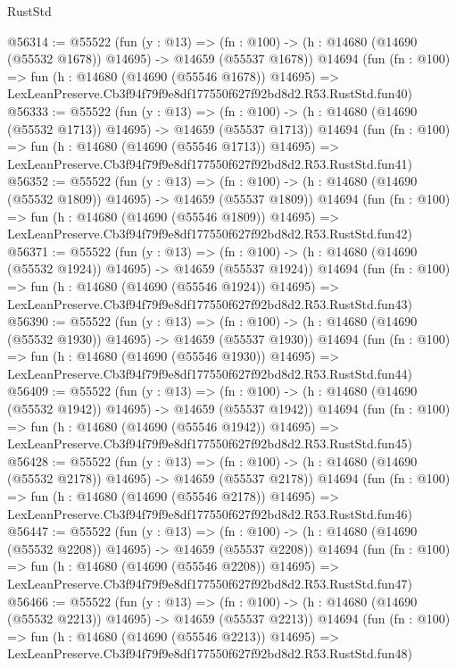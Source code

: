 \begin{lexlean}{RustStd}
\begin{coremodule}
@56314 := @55522
    (fun (y : @13) =>
    (fn : @100) -> (h : @14680 (@14690 (@55532 @1678)) @14695) -> @14659 (@55537 @1678))
    @14694
    (fun (fn : @100) =>
    fun (h : @14680 (@14690 (@55546 @1678)) @14695) =>
    LexLeanPreserve.Cb3f94f79f9e8df177550f627f92bd8d2.R53.RustStd.fun40)
@56333 := @55522
    (fun (y : @13) =>
    (fn : @100) -> (h : @14680 (@14690 (@55532 @1713)) @14695) -> @14659 (@55537 @1713))
    @14694
    (fun (fn : @100) =>
    fun (h : @14680 (@14690 (@55546 @1713)) @14695) =>
    LexLeanPreserve.Cb3f94f79f9e8df177550f627f92bd8d2.R53.RustStd.fun41)
@56352 := @55522
    (fun (y : @13) =>
    (fn : @100) -> (h : @14680 (@14690 (@55532 @1809)) @14695) -> @14659 (@55537 @1809))
    @14694
    (fun (fn : @100) =>
    fun (h : @14680 (@14690 (@55546 @1809)) @14695) =>
    LexLeanPreserve.Cb3f94f79f9e8df177550f627f92bd8d2.R53.RustStd.fun42)
@56371 := @55522
    (fun (y : @13) =>
    (fn : @100) -> (h : @14680 (@14690 (@55532 @1924)) @14695) -> @14659 (@55537 @1924))
    @14694
    (fun (fn : @100) =>
    fun (h : @14680 (@14690 (@55546 @1924)) @14695) =>
    LexLeanPreserve.Cb3f94f79f9e8df177550f627f92bd8d2.R53.RustStd.fun43)
@56390 := @55522
    (fun (y : @13) =>
    (fn : @100) -> (h : @14680 (@14690 (@55532 @1930)) @14695) -> @14659 (@55537 @1930))
    @14694
    (fun (fn : @100) =>
    fun (h : @14680 (@14690 (@55546 @1930)) @14695) =>
    LexLeanPreserve.Cb3f94f79f9e8df177550f627f92bd8d2.R53.RustStd.fun44)
@56409 := @55522
    (fun (y : @13) =>
    (fn : @100) -> (h : @14680 (@14690 (@55532 @1942)) @14695) -> @14659 (@55537 @1942))
    @14694
    (fun (fn : @100) =>
    fun (h : @14680 (@14690 (@55546 @1942)) @14695) =>
    LexLeanPreserve.Cb3f94f79f9e8df177550f627f92bd8d2.R53.RustStd.fun45)
@56428 := @55522
    (fun (y : @13) =>
    (fn : @100) -> (h : @14680 (@14690 (@55532 @2178)) @14695) -> @14659 (@55537 @2178))
    @14694
    (fun (fn : @100) =>
    fun (h : @14680 (@14690 (@55546 @2178)) @14695) =>
    LexLeanPreserve.Cb3f94f79f9e8df177550f627f92bd8d2.R53.RustStd.fun46)
@56447 := @55522
    (fun (y : @13) =>
    (fn : @100) -> (h : @14680 (@14690 (@55532 @2208)) @14695) -> @14659 (@55537 @2208))
    @14694
    (fun (fn : @100) =>
    fun (h : @14680 (@14690 (@55546 @2208)) @14695) =>
    LexLeanPreserve.Cb3f94f79f9e8df177550f627f92bd8d2.R53.RustStd.fun47)
@56466 := @55522
    (fun (y : @13) =>
    (fn : @100) -> (h : @14680 (@14690 (@55532 @2213)) @14695) -> @14659 (@55537 @2213))
    @14694
    (fun (fn : @100) =>
    fun (h : @14680 (@14690 (@55546 @2213)) @14695) =>
    LexLeanPreserve.Cb3f94f79f9e8df177550f627f92bd8d2.R53.RustStd.fun48)

\end{coremodule}
\end{lexlean}
